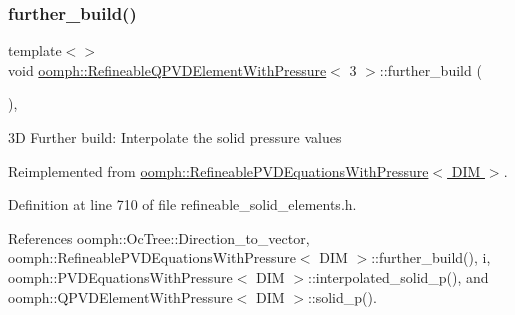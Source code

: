 \mbox{\label{classoomph_1_1RefineableQPVDElementWithPressure_ab1e141199db731d930fd5b0a70b994b3}} 
\subsubsection{\texorpdfstring{further\+\_\+build()}{further\_build()}\hspace{0.1cm}{\footnotesize\ttfamily [3/3]}}
{\footnotesize\ttfamily template$<$$>$ \\
void \hyperlink{classoomph_1_1RefineableQPVDElementWithPressure}{oomph\+::\+Refineable\+Q\+P\+V\+D\+Element\+With\+Pressure}$<$ 3 $>$\+::further\+\_\+build (\begin{DoxyParamCaption}{ }\end{DoxyParamCaption})\hspace{0.3cm}{\ttfamily [inline]}, {\ttfamily [virtual]}}



3D Further build\+: Interpolate the solid pressure values 



Reimplemented from \hyperlink{classoomph_1_1RefineablePVDEquationsWithPressure_aad92965f2aec749e75580d003eebdc91}{oomph\+::\+Refineable\+P\+V\+D\+Equations\+With\+Pressure$<$ D\+I\+M $>$}.



Definition at line 710 of file refineable\+\_\+solid\+\_\+elements.\+h.



References oomph\+::\+Oc\+Tree\+::\+Direction\+\_\+to\+\_\+vector, oomph\+::\+Refineable\+P\+V\+D\+Equations\+With\+Pressure$<$ D\+I\+M $>$\+::further\+\_\+build(), i, oomph\+::\+P\+V\+D\+Equations\+With\+Pressure$<$ D\+I\+M $>$\+::interpolated\+\_\+solid\+\_\+p(), and oomph\+::\+Q\+P\+V\+D\+Element\+With\+Pressure$<$ D\+I\+M $>$\+::solid\+\_\+p().

\mbox{\label{classoomph_1_1RefineableQPVDElementWithPressure_a649a8dd890c32322ad55c70100f02883}} 
